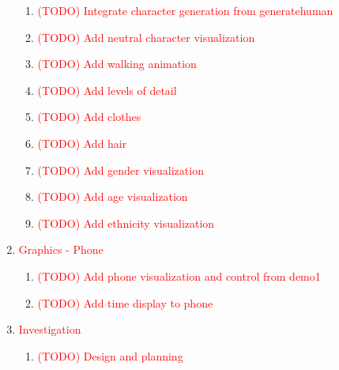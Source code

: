\documentclass[a4paper, twoside]{article}
\begin{document}
\begin{enumerate}
\begin{enumerate}
		\item{} \textcolor{red}{(TODO) Integrate character generation from generatehuman}
		\item{} \textcolor{red}{(TODO) Add neutral character visualization}
		\item{} \textcolor{red}{(TODO) Add walking animation}
		\item{} \textcolor{red}{(TODO) Add levels of detail}
		\item{} \textcolor{red}{(TODO) Add clothes}
		\item{} \textcolor{red}{(TODO) Add hair}
		\item{} \textcolor{red}{(TODO) Add gender visualization}
		\item{} \textcolor{red}{(TODO) Add age visualization}
		\item{} \textcolor{red}{(TODO) Add ethnicity visualization}
	\end{enumerate}
	\item{} \textcolor{red}{Graphics - Phone} \begin{enumerate}
		\item{} \textcolor{red}{(TODO) Add phone visualization and control from demo1}
		\item{} \textcolor{red}{(TODO) Add time display to phone}
	\end{enumerate}
	\item{} \textcolor{red}{Investigation} \begin{enumerate}
		\item{} \textcolor{red}{(TODO) Design and planning}
	\end{enumerate}
\end{enumerate}
\end{document}
